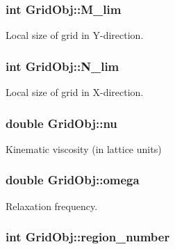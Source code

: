 \subsubsection[{\texorpdfstring{M\+\_\+lim}{M_lim}}]{\setlength{\rightskip}{0pt plus 5cm}int Grid\+Obj\+::\+M\+\_\+lim}\hypertarget{class_grid_obj_a01d3f362634c896ecdb80f0e6304c12f}{}\label{class_grid_obj_a01d3f362634c896ecdb80f0e6304c12f}


Local size of grid in Y-\/direction. 

\subsubsection[{\texorpdfstring{N\+\_\+lim}{N_lim}}]{\setlength{\rightskip}{0pt plus 5cm}int Grid\+Obj\+::\+N\+\_\+lim}\hypertarget{class_grid_obj_a5eb35752a7c0741510975d9ee6aa3ce1}{}\label{class_grid_obj_a5eb35752a7c0741510975d9ee6aa3ce1}


Local size of grid in X-\/direction. 

\subsubsection[{\texorpdfstring{nu}{nu}}]{\setlength{\rightskip}{0pt plus 5cm}double Grid\+Obj\+::nu}\hypertarget{class_grid_obj_a755f85eb5480d959211e00937a478ae9}{}\label{class_grid_obj_a755f85eb5480d959211e00937a478ae9}


Kinematic viscosity (in lattice units) 

\subsubsection[{\texorpdfstring{omega}{omega}}]{\setlength{\rightskip}{0pt plus 5cm}double Grid\+Obj\+::omega}\hypertarget{class_grid_obj_a21461e5d39c5ae83ae42170c829e9da3}{}\label{class_grid_obj_a21461e5d39c5ae83ae42170c829e9da3}


Relaxation frequency. 

\subsubsection[{\texorpdfstring{region\+\_\+number}{region_number}}]{\setlength{\rightskip}{0pt plus 5cm}int Grid\+Obj\+::region\+\_\+number}\hypertarget{class_grid_obj_ae0b724f2d977cfe38df2bb191e2fb042}{}\label{class_grid_obj_ae0b724f2d977cfe38df2bb191e2fb042}


